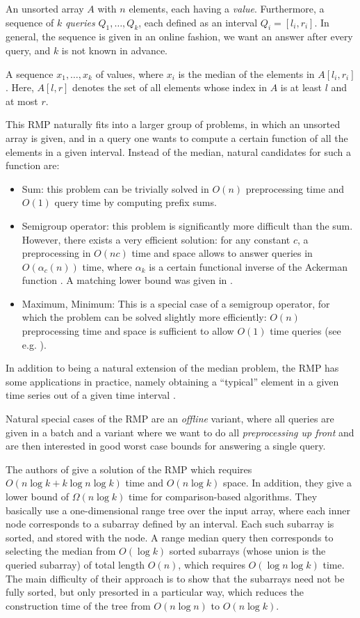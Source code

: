 \documentclass[a4paper,10pt]{article}
\begin{document}
 An unsorted array $A$ with $n$ elements, each
having a \emph{value}. Furthermore, a sequence of $k$ \emph{queries}
$Q_1,\ldots,Q_k$, each defined as an interval $Q_i =[l_i,r_i]$.
In general, the sequence is given in an online
fashion, 
we want an answer after every query, and $k$ is not known in advance.

 A sequence $x_1,\ldots,x_k$ of values, where
$x_i$ is the median of the elements in $A[l_i,r_i]$.  Here, $A[l,r]$
denotes the set of all elements whose index in $A$ is at least
$l$ and at most $r$.


This RMP naturally fits into a larger group of problems, in which an
unsorted array is given, and in a query one wants to compute a certain function of all the elements in a
given interval. 
Instead of the median, natural candidates for such a function are:
\begin{itemize}
 \item Sum: this problem can be trivially solved in $O(n)$ preprocessing time and $O(1)$ query time by computing prefix sums.
\item Semigroup operator: this problem is significantly more difficult than the sum. However, there exists a very efficient solution: for any constant $c$, a preprocessing in $O(nc)$ time and space allows to answer queries in $O(\alpha_c(n))$ time,
where $\alpha_k$ is a certain functional inverse of the Ackerman function \cite{802185}. A matching lower bound was given in \cite{DBLP:journals/siamcomp/Yao85a}.
\item Maximum, Minimum: This is a special case of a semigroup operator, for which the problem can be solved slightly more efficiently: $O(n)$ preprocessing time and space is sufficient to allow $O(1)$ time queries (see e.g. \cite{DBLP:journals/tcs/BenderF04}).
\end{itemize}
In addition to being a natural extension of the median problem, the RMP has some applications in practice, namely obtaining a ``typical'' element in a given time series out of a given time interval \cite{DBLP:conf/esa/Har-PeledM08}.

Natural special cases of the RMP are an \emph{offline} variant, where all queries are given 
in a batch and a variant where we want to do all \emph{preprocessing up front} and are then interested in
good worst case bounds for answering a single query.


The authors of \cite{DBLP:conf/esa/Har-PeledM08} give a solution of
the RMP which requires $O(n \log k + k\log n \log k)$ time and
$O(n\log k)$ space. In addition, they give a lower bound of
$\Omega(n\log k)$ time for comparison-based algorithms.
They basically use a one-dimensional range tree over the input array, where each inner node corresponds to a
subarray defined by an interval. Each such subarray is  sorted, and stored with the node. 
A range median query then corresponds to selecting the median from $O(\log k)$  sorted subarrays (whose union is the queried subarray) of total length $O(n)$, which requires $O(\log n \log k)$ time. 
The main difficulty of their approach is to show that  the subarrays need  not be fully sorted, but only presorted in a particular way, which 
reduces the construction time of the tree from $O(n\log n)$ to $O(n \log k)$.
\end{document}
